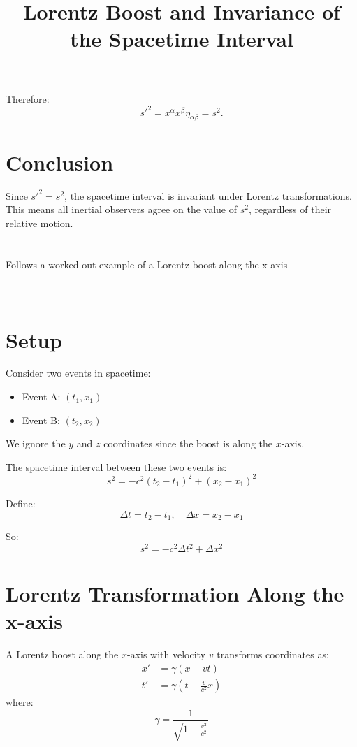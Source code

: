 \documentclass{article}
\begin{document}
	Therefore:
	\[
	s'^2 = x^\alpha x^\beta \eta_{\alpha\beta} = s^2.
	\]
	
	\section*{Conclusion}
	
	Since \( s'^2 = s^2 \), the spacetime interval is invariant under Lorentz transformations. This means all inertial observers agree on the value of \( s^2 \), regardless of their relative motion.\\
\\
\\
	
Follows a worked out example of a Lorentz-boost along the x-axis\\
\\
\\
 
\title{Lorentz Boost and Invariance of the Spacetime Interval}
\author{}
\date{}


	
	\maketitle
	
	\section*{Setup}
	
	Consider two events in spacetime:
	\begin{itemize}
		\item Event A: $(t_1, x_1)$
		\item Event B: $(t_2, x_2)$
	\end{itemize}
	
	We ignore the $y$ and $z$ coordinates since the boost is along the $x$-axis.
	
	The spacetime interval between these two events is:
	\[
	s^2 = -c^2(t_2 - t_1)^2 + (x_2 - x_1)^2
	\]
	
	Define:
	\[
	\Delta t = t_2 - t_1, \quad \Delta x = x_2 - x_1
	\]
	
	So:
	\[
	s^2 = -c^2 \Delta t^2 + \Delta x^2
	\]
	
	\section*{Lorentz Transformation Along the x-axis}
	
	A Lorentz boost along the $x$-axis with velocity $v$ transforms coordinates as:
	\[
	\begin{aligned}
		x' &= \gamma(x - vt) \\
		t' &= \gamma\left(t - \frac{v}{c^2}x\right)
	\end{aligned}
	\]
	where:
	\[
	\gamma = \frac{1}{\sqrt{1 - \frac{v^2}{c^2}}}
	\]
	
\end{document}
